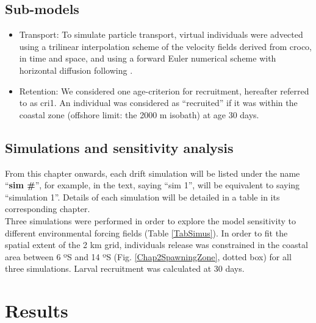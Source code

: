 \subsection{Sub-models}\label{Chap2MethSubMod}

\begin{itemize}

\item Transport: To simulate particle transport, virtual individuals were advected using a trilinear interpolation scheme of the velocity fields derived from \acrshort{croco}, in time and space, and using a forward Euler numerical scheme with horizontal diffusion following \cite{PeliMarc2007}.\\

\item Retention: We considered one age-criterion for recruitment, hereafter referred to as \gls{cri1}. An individual was considered as ``recruited'' if it was within the coastal zone (offshore limit: the 2000 m isobath) at age 30 days.\\

\end{itemize}

\subsection{Simulations and sensitivity analysis}\label{Chap2MethSimSens}

From this chapter onwards, each drift simulation will be listed under the name ``\textbf{sim \#}'', for example, in the text, saying ``sim 1'', will be equivalent to saying ``simulation 1''. Details of each simulation will be detailed in a table in its corresponding chapter.\\

Three simulations were performed in order to explore the model sensitivity to different environmental forcing fields (Table \ref{TabSimus}). In order to fit the spatial extent of the 2 km grid, individuals release was constrained in the coastal area between 6 ºS and 14 ºS (Fig. \ref{Chap2SpawningZone}, dotted box) for all three simulations. Larval recruitment was calculated at 30 days.\\

\clearpage

\section{Results}\label{Chap2Resu}

